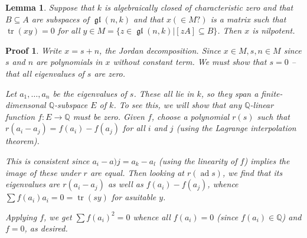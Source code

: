 \documentclass[12pt]{article}
\theoremstyle{nonumberbreak}
\theoremstyle{changebreak}
\newtheorem{lem}[thm]{Lemma}
\theoremstyle{nonumberbreak}
\newtheorem{prf}{Proof}
\theoremstyle{change}
\newcommand*{\Q}{
\mathbb{Q}
}
\DeclareMathOperator{\gl}{\mathfrak{gl}}
\DeclareMathOperator{\tr}{tr}
\DeclareMathOperator{\ad}{ad}
\begin{document}
\begin{lem}
	Suppose that $k$ is algebraically closed of characteristic zero and that $B\subseteq A$ are subspaces of $\gl(n,k)$ and that $x(\in M?)$ is a matrix such that 
	$\tr(xy)=0$ for all $y\in M=\{z\in\gl(n,k)|[zA]\subseteq B\}$. Then $x$ is nilpotent.
\end{lem}
\begin{prf}
	Write $x=s+n$, the Jordan decomposition. Since $x\in M, s,n\in M$ since $s$ and $n$ are polynomials in 
	$x$ without constant term. We must show that $s=0$ -- that all eigenvalues of $s$ are zero.

	Let $a_1,\dots,a_n$ be the eigenvalues of $s$. These all lie in $k$, so they span a finite-dimensonal $\Q$-subspace $E$
	of $k$. To see this, we will show that any $\Q$-linear function $f:E\to\Q$ must be zero. Given $f$, 
	choose a polynomial $r(s)$ such that $r(a_i-a_j)=f(a_i)-f(a_j)$ for all $i$ and $j$ (using the Lagrange interpolation theorem).

	This is consistent since $a_i-a)j=a_k-a_l$ (using the linearity of $f$) implies the image of these under $r$ are equal.
	Then looking at $r(\ad s)$, we find that its eigenvalues are $r(a_i-a_j)$ as well as $f(a_i)-f(a_j)$,
	whence $\sum f(a_i)a_i=0=\tr(sy)$ for asuitable $y$.

	Applying $f$, we get $\sum f(a_i)^2=0$ whence all $f(a_i)=0$ (since $f(a_i)\in\Q$) and $f=0$, as desired.
\end{prf}
\end{document}

